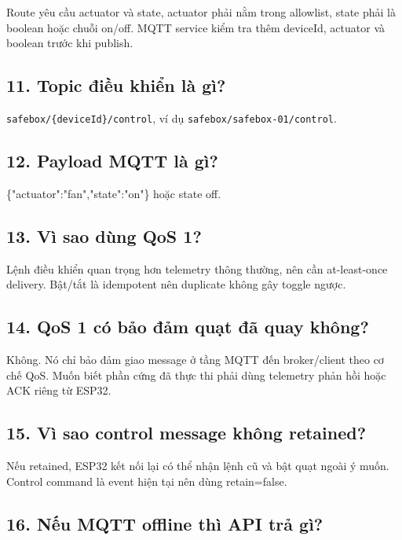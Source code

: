 \documentclass[11pt,oneside,openany]{book}
\renewcommand{\texttt}[1]{{\ttfamily\small #1}}
\begin{document}
Route yêu cầu actuator và state, actuator phải nằm trong allowlist,
state phải là boolean hoặc chuỗi on/off. MQTT service kiểm tra thêm
deviceId, actuator và boolean trước khi publish.

\subsection{11. Topic điều khiển là
gì?}\label{11-topic-ux111iux1ec1u-khiux1ec3n-luxe0-guxec}

\nolinkurl{safebox/{deviceId}/control}, ví dụ
\nolinkurl{safebox/safebox-01/control}.

\subsection{12. Payload MQTT là gì?}\label{12-payload-mqtt-luxe0-guxec}

\texttt{\{"actuator":"fan","state":"on"\}} hoặc state \texttt{off}.

\subsection{13. Vì sao dùng QoS 1?}\label{13-vuxec-sao-duxf9ng-qos-1}

Lệnh điều khiển quan trọng hơn telemetry thông thường, nên cần
at-least-once delivery. Bật/tắt là idempotent nên duplicate không gây
toggle ngược.

\subsection{14. QoS 1 có bảo đảm quạt đã quay
không?}\label{14-qos-1-cuxf3-bux1ea3o-ux111ux1ea3m-quux1ea1t-ux111uxe3-quay-khuxf4ng}

Không. Nó chỉ bảo đảm giao message ở tầng MQTT đến broker/client theo cơ
chế QoS. Muốn biết phần cứng đã thực thi phải dùng telemetry phản hồi
hoặc ACK riêng từ ESP32.

\subsection{15. Vì sao control message không
retained?}\label{15-vuxec-sao-control-message-khuxf4ng-retained}

Nếu retained, ESP32 kết nối lại có thể nhận lệnh cũ và bật quạt ngoài ý
muốn. Control command là event hiện tại nên dùng \texttt{retain=false}.

\subsection{16. Nếu MQTT offline thì API trả
gì?}\label{16-nux1ebfu-mqtt-offline-thuxec-api-trux1ea3-guxec}
\end{document}
